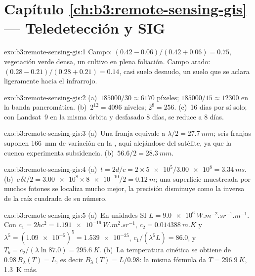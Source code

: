 \section*{Capítulo \ref{ch:b3:remote-sensing-gis} --- Teledetección y SIG}

\begin{solution}{exo:b3:remote-sensing-gis:1}
Campo: $(0.42 - 0.06)/(0.42 + 0.06) = 0.75$, vegetación verde densa, un cultivo
en plena foliación. Campo arado: $(0.28 - 0.21)/(0.28 + 0.21) = 0.14$, casi
suelo desnudo, un suelo que se aclara ligeramente hacia el infrarrojo.
\end{solution}

\begin{solution}{exo:b3:remote-sensing-gis:2}
(a)~$185000/30 \approx 6170$ píxeles; $185000/15 \approx 12300$ en la
banda pancromática. (b)~$2^{12} = 4096$ niveles; $2^8 = 256$. (c)~16 días
por sí solo; con Landsat~9 en la misma órbita y desfasado 8 días, se reduce a 8 días.
\end{solution}

\begin{solution}{exo:b3:remote-sensing-gis:3}
(a)~Una franja equivale a $\lambda/2 = \qty{27.7}{mm}$; seis franjas suponen
\qty{166}{mm} de variación en la , aquí alejándose del satélite, ya que
la cuenca experimenta subsidencia. (b)~$56.6/2 = \qty{28.3}{mm}$.
\end{solution}

\begin{solution}{exo:b3:remote-sensing-gis:4}
(a)~$t = 2d/c = 2\times\num{5e5}/\num{3.00e8} = \qty{3.34}{ms}$.
(b)~$c\,\delta t/2 = \num{3.00e8}\times\num{8e-10}/2 = \qty{0.12}{m}$; una
superficie muestreada por muchos fotones se localiza mucho mejor, la precisión
disminuye como la inversa de la raíz cuadrada de su número.
\end{solution}

\begin{solution}{exo:b3:remote-sensing-gis:5}
(a)~En unidades SI $L = \qty{9.0e6}{W.m^{-2}.sr^{-1}.m^{-1}}$. Con $c_1 =
2hc^2 = \qty{1.191e-16}{W.m^2.sr^{-1}}$, $c_2 = \qty{0.014388}{m.K}$ y
$\lambda^5 = (\num{1.09e-5})^5 = \num{1.539e-25}$, $c_1/(\lambda^5L) = 86.0$,
y $T_b = c_2/(\lambda\ln 87.0) = \qty{295.6}{K}$. (b)~La temperatura cinética
se obtiene de $0.98\,B_\lambda(T) = L$, es decir $B_\lambda(T) = L/0.98$: la misma
fórmula da $T = \qty{296.9}{K}$, \qty{1.3}{K} más.
\end{solution}

